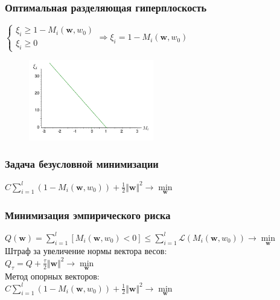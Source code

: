 \documentclass[12pt]{beamer}
\begin{document}
\begin{frame}\frametitle{Оптимальная разделяющая гиперплоскость}
$\begin{cases}
\xi_i \geq 1 - M_i(\mathbf{w}, w_0) \\
\xi_i \geq 0
\end{cases} \Rightarrow \xi_i = 1 - M_i(\mathbf{w}, w_0) $\\

\begin{figure}[htbp]
  \includegraphics[height=100pt, keepaspectratio = true]{images/xi}   
\end{figure}
\end{frame}


\begin{frame}\frametitle{Задача безусловной минимизации}
$ C \sum\limits_{i=1}^l (1 - M_i(\mathbf{w}, w_0)) + \frac{1}{2}\Vert \mathbf{w} \Vert^2 \rightarrow \min\limits_{\mathbf{w}}$
\end{frame}


\begin{frame}\frametitle{Минимизация эмпирического риска}
${Q(\mathbf{w}) = \sum\limits_{i=1}^l \left[ M_i(\mathbf{w}, w_0) < 0 \right] \leq\sum\limits_{i=1}^l \mathcal{L}(M_i(\mathbf{w}, w_0)) \rightarrow \min\limits_{\mathbf{w}} }$\\\vspace{3mm}
Штраф за увеличение нормы вектора весов:\\
$Q_{\tau} = Q + \frac{\tau}{2}\Vert \mathbf{w} \Vert^2 \rightarrow \min\limits_{\mathbf{w}}$\\
\vspace{5mm}
Метод опорных векторов:\\
$ C\sum\limits_{i=1}^l (1 - M_i(\mathbf{w}, w_0)) + \frac{1}{2}\Vert \mathbf{w} \Vert^2 \rightarrow \min\limits_{\mathbf{w}}$

\end{frame}
\end{document}
